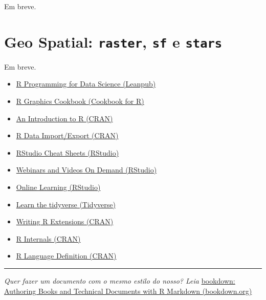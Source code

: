 \documentclass[]{book}
\providecommand{\tightlist}{%
  \setlength{\itemsep}{0pt}\setlength{\parskip}{0pt}}
\theoremstyle{definition}
\theoremstyle{definition}
\theoremstyle{definition}
\theoremstyle{remark}
\begin{document}
Em breve.

\chapter{\texorpdfstring{Geo Spatial: \texttt{raster}, \texttt{sf} e
\texttt{stars}}{Geo Spatial: raster, sf e stars}}\label{geo}

Em breve.

\begin{itemize}
\tightlist
\item
  \href{https://leanpub.com/rprogramming}{R Programming for Data Science
  (Leanpub)}\\
\item
  \href{http://www.cookbook-r.com/Graphs/}{R Graphics Cookbook (Cookbook
  for R)}\\
\item
  \href{https://cran.r-project.org/doc/manuals/r-release/R-intro.html}{An
  Introduction to R (CRAN)}\\
\item
  \href{https://cran.r-project.org/doc/manuals/r-release/R-data.html}{R
  Data Import/Export (CRAN)}\\
\item
  \href{https://www.rstudio.com/resources/cheatsheets/}{RStudio Cheat
  Sheets (RStudio)}\\
\item
  \href{https://www.rstudio.com/resources/webinars/}{Webinars and Videos
  On Demand (RStudio)}\\
\item
  \href{https://www.rstudio.com/online-learning/}{Online Learning
  (RStudio)}\\
\item
  \href{https://www.tidyverse.org/learn/}{Learn the tidyverse
  (Tidyverse)}
\item
  \href{https://cran.r-project.org/doc/manuals/r-release/R-exts.html}{Writing
  R Extensions (CRAN)}\\
\item
  \href{https://cran.r-project.org/doc/manuals/r-release/R-ints.html}{R
  Internals (CRAN)}\\
\item
  \href{https://cran.r-project.org/doc/manuals/r-release/R-lang.html}{R
  Language Definition (CRAN)}
\end{itemize}

\begin{center}\rule{0.5\linewidth}{\linethickness}\end{center}

\emph{Quer fazer um documento com o mesmo estilo do nosso? Leia}
\href{https://bookdown.org/yihui/bookdown/}{bookdown: Authoring Books
and Technical Documents with R Markdown (bookdown.org)}


\end{document}
